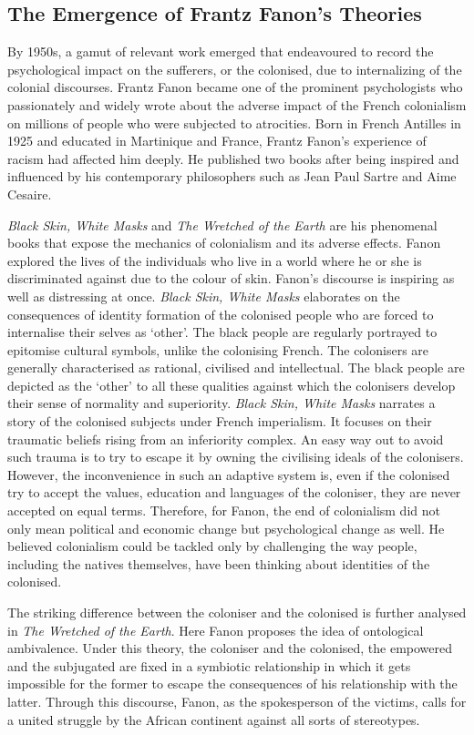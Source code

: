 \subsection{The Emergence of Frantz Fanon’s Theories}

By 1950s, a gamut of relevant work emerged that endeavoured to record the psychological impact on the sufferers, or the colonised, due to internalizing of the colonial discourses. Frantz Fanon became one of the prominent psychologists who passionately and widely wrote about the adverse impact of the French colonialism on millions of people who were subjected to atrocities. Born in French Antilles in 1925 and educated in Martinique and France, Frantz Fanon’s experience of racism had affected him deeply. He published two books after being inspired and influenced by his contemporary philosophers such as Jean Paul Sartre and Aime Cesaire. 

\emph{Black Skin, White Masks} and \emph{The Wretched of the Earth} are his phenomenal books that expose the mechanics of colonialism and its adverse effects. Fanon explored the lives of the individuals who live in a world where he or she is discriminated against due to the colour of skin. Fanon’s discourse is inspiring as well as distressing at once. \emph{Black Skin, White Masks} elaborates on the consequences of identity formation of the colonised people who are forced to internalise their selves as ‘other’. The black people are regularly portrayed to epitomise cultural symbols, unlike the colonising French. The colonisers are generally characterised as rational, civilised and intellectual. The black people are depicted as the ‘other’ to all these qualities against which the colonisers develop their sense of normality and superiority. \emph{Black Skin, White Masks} narrates a story of the colonised subjects under French imperialism. It focuses on their traumatic beliefs rising from an inferiority complex. An easy way out to avoid such trauma is to try to escape it by owning the civilising ideals of the colonisers. However, the inconvenience in such an adaptive system is, even if the colonised try to accept the values, education and languages of the coloniser, they are never accepted on equal terms. Therefore, for Fanon, the end of colonialism did not only mean political and economic change but psychological change as well. He believed colonialism could be tackled only by challenging the way people, including the natives themselves, have been thinking about identities of the colonised. 

The striking difference between the coloniser and the colonised is further analysed in \emph{The Wretched of the Earth}. Here Fanon proposes the idea of ontological ambivalence. Under this theory, the coloniser and the colonised, the empowered and the subjugated are fixed in a symbiotic relationship in which it gets impossible for the former to escape the consequences of his relationship with the latter. Through this discourse, Fanon, as the spokesperson of the victims, calls for a united struggle by the African continent against all sorts of stereotypes.

